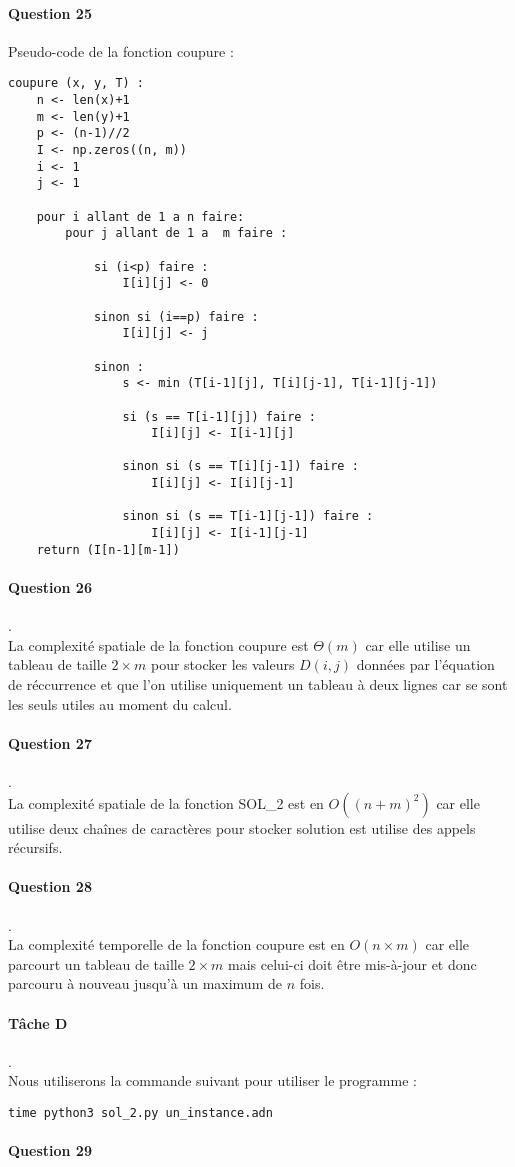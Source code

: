 \paragraph{Question 25}
Pseudo-code de la fonction coupure :
\begin{lstlisting}
coupure (x, y, T) :
    n <- len(x)+1
    m <- len(y)+1
    p <- (n-1)//2
    I <- np.zeros((n, m))
    i <- 1
    j <- 1

    pour i allant de 1 a n faire:
        pour j allant de 1 a  m faire :

            si (i<p) faire :
                I[i][j] <- 0

            sinon si (i==p) faire :
                I[i][j] <- j

            sinon :
                s <- min (T[i-1][j], T[i][j-1], T[i-1][j-1])

                si (s == T[i-1][j]) faire :
                    I[i][j] <- I[i-1][j]

                sinon si (s == T[i][j-1]) faire :
                    I[i][j] <- I[i][j-1]

                sinon si (s == T[i-1][j-1]) faire :
                    I[i][j] <- I[i-1][j-1]
    return (I[n-1][m-1])
\end{lstlisting}
\paragraph{Question 26}.\\
La complexité spatiale de la fonction coupure est $\Theta(m)$ car elle utilise un tableau de taille $2\times m$ pour stocker les valeurs $D(i,j)$ données par l'équation de réccurrence et que l'on utilise uniquement un tableau à deux lignes car se sont les seuls utiles au moment du calcul.
\paragraph{Question 27}.\\
La complexité spatiale de la fonction SOL\_2 est en $O((n+m)^2)$ car elle utilise deux chaînes de caractères pour stocker solution est utilise des appels récursifs.
\paragraph{Question 28}.\\
La complexité temporelle de la fonction coupure est en $O(n\times m)$ car elle parcourt un tableau de taille $2 \times m$ mais celui-ci doit être mis-à-jour et donc parcouru à nouveau jusqu'à un maximum de $n$ fois.
\paragraph{Tâche D}.\\
Nous utiliserons la commande suivant pour utiliser le programme :
\begin{lstlisting}
time python3 sol_2.py un_instance.adn
\end{lstlisting}
\paragraph{Question 29}
